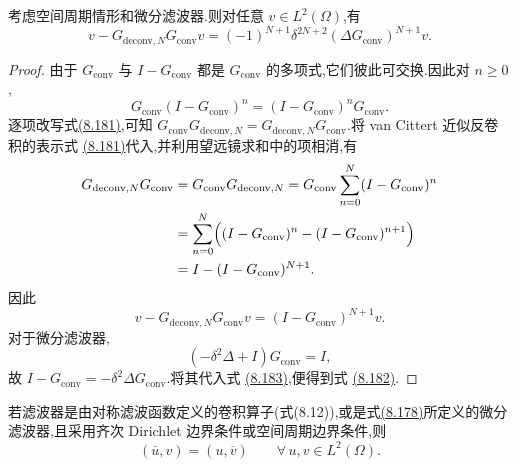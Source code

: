 \begin{lemma}[近似反卷积误差的表示]
\label{lem:les-adm-error-representation}
考虑空间周期情形和微分滤波器.则对任意 $v\in L^2(\Omega)$,有
\begin{equation}\label{eq:les-adm-error-representation}
 v-G_{\mathrm{deconv},N}G_{\mathrm{conv}}v
 =(-1)^{N+1}\delta^{2N+2}
  (\Delta G_{\mathrm{conv}})^{N+1}v.
\end{equation}
\end{lemma}
\begin{proof}
由于 $G_{\mathrm{conv}}$ 与 $I-G_{\mathrm{conv}}$ 都是 $G_{\mathrm{conv}}$ 的多项式,它们彼此可交换.因此对 $n\ge0$,
\[
 G_{\mathrm{conv}}(I-G_{\mathrm{conv}})^n
 =(I-G_{\mathrm{conv}})^nG_{\mathrm{conv}}.
\]
逐项改写式\hyperref[eq:van-cittert-sum-representation]{(8.181)},可知
$G_{\mathrm{conv}}G_{\mathrm{deconv},N}
 =G_{\mathrm{deconv},N}G_{\mathrm{conv}}$.将 van Cittert 近似反卷积的表示式
\hyperref[eq:van-cittert-sum-representation]{(8.181)}代入,并利用望远镜求和中的项相消,有
\[
\begin{aligned}
 G_{\mathrm{deconv},N}G_{\mathrm{conv}}
 &=G_{\mathrm{conv}}G_{\mathrm{deconv},N}
  =G_{\mathrm{conv}}
    \sum_{n=0}^N(I-G_{\mathrm{conv}})^n\\
 &=\sum_{n=0}^N
   \Bigl((I-G_{\mathrm{conv}})^n
       -(I-G_{\mathrm{conv}})^{n+1}\Bigr)\\
 &=I-(I-G_{\mathrm{conv}})^{N+1}.
\end{aligned}
\]
因此
\begin{equation}\label{eq:les-adm-error-telescoping}
 v-G_{\mathrm{deconv},N}G_{\mathrm{conv}}v
 =(I-G_{\mathrm{conv}})^{N+1}v.
\end{equation}
对于微分滤波器,
\[
 (-\delta^2\Delta+I)G_{\mathrm{conv}}=I,
\]
故 $I-G_{\mathrm{conv}}=-\delta^2\Delta G_{\mathrm{conv}}$.将其代入式
\hyperref[eq:les-adm-error-telescoping]{(8.183)},便得到式
\hyperref[eq:les-adm-error-representation]{(8.182)}.
\end{proof}
\begin{lemma}[滤波算子的自伴性]
\label{lem:les-filter-selfadjoint}
若滤波器是由对称滤波函数定义的卷积算子(式(8.12)),或是式\hyperref[eq:les-adm-differential-filter]{(8.178)}所定义的微分滤波器,且采用齐次 Dirichlet 边界条件或空间周期边界条件,则
\begin{equation}\label{eq:les-filter-selfadjoint}
 (\overline{u},v)=(u,\overline{v})
 \qquad\forall\,u,v\in L^2(\Omega).
\end{equation}
\end{lemma}
